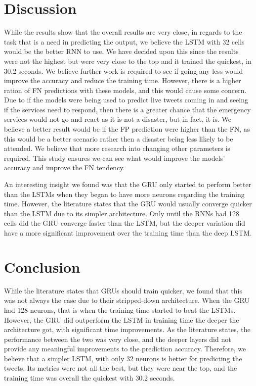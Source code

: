\documentclass[a4paper,10pt]{article}
\begin{document}
\section{Discussion}
	While the results show that the overall results are very close, in regards to the task that is a need in predicting the output, we believe the LSTM with 32 cells would be the better RNN to use. We have decided upon this since the results were not the highest but were very close to the top and it trained the quickest, in 30.2 seconds. We believe further work is required to see if going any less would improve the accuracy and reduce the training time. However, there is a higher ration of FN predictions with these models, and this would cause some concern. Due to if the models were being used to predict live tweets coming in and seeing if the services need to respond, then there is a greater chance that the emergency services would not go and react as it is not a disaster, but in fact, it is. We believe a better result would be if the FP prediction were higher than the FN, as this would be a better scenario rather then a disaster being less likely to be attended. We believe that more research into changing other parameters is required. This study ensures we can see what would improve the models' accuracy and improve the FN tendency.
	
	An interesting insight we found was that the GRU only started to perform better than the LSTMs when they began to have more neurons regarding the training time. However, the literature states that the GRU would usually converge quicker than the LSTM due to its simpler architecture. Only until the RNNs had 128 cells did the GRU converge faster than the LSTM, but the deeper variation did have a more significant improvement over the training time than the deep LSTM.
	
	

\section{Conclusion}
	While the literature states that GRUs should train quicker, we found that this was not always the case due to their stripped-down architecture. When the GRU had 128 neurons, that is when the training time started to beat the LSTMs. However, the GRU did outperform the LSTM in training time the deeper the architecture got, with significant time improvements. As the literature states, the performance between the two was very close, and the deeper layers did not provide any meaningful improvements to the prediction accuracy. Therefore, we believe that a simpler LSTM, with only 32 neurons is better for predicting the tweets. Its metrics were not all the best, but they were near the top, and the training time was overall the quickest with 30.2 seconds.
	
\end{document}
